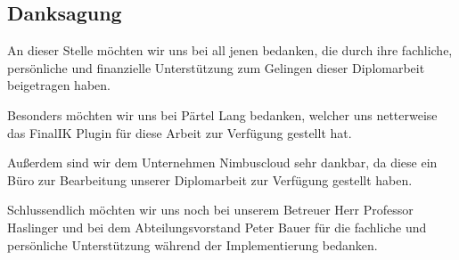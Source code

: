 \begin{spacing}{1}

    \chapter*{Danksagung}

\end{spacing}

An dieser Stelle möchten wir uns bei all jenen bedanken, die durch ihre fachliche, persönliche und finanzielle Unterstützung zum Gelingen dieser Diplomarbeit beigetragen haben.

Besonders möchten wir uns bei Pärtel Lang bedanken, welcher uns netterweise das FinalIK Plugin für diese Arbeit zur Verfügung gestellt hat.

Außerdem sind wir dem Unternehmen Nimbuscloud sehr dankbar, da diese ein Büro zur Bearbeitung unserer Diplomarbeit zur Verfügung gestellt haben.

Schlussendlich möchten wir uns noch bei unserem Betreuer Herr Professor Haslinger und bei dem Abteilungsvorstand Peter Bauer für die fachliche und persönliche Unterstützung während der Implementierung bedanken.
